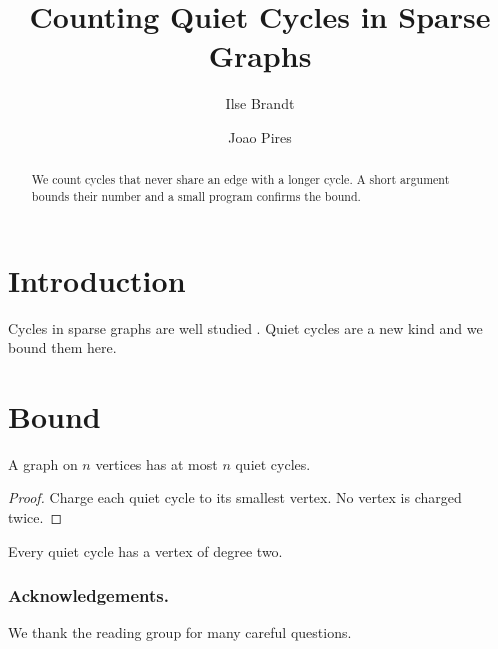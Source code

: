 \documentclass{llncs}
\begin{document}
\title{Counting Quiet Cycles in Sparse Graphs}
\author{Ilse Brandt \and Joao Pires}

\maketitle

\begin{abstract}
We count cycles that never share an edge with a longer cycle. A short
argument bounds their number and a small program confirms the bound.
\end{abstract}

\section{Introduction}
Cycles in sparse graphs are well studied \cite{brandt18}. Quiet cycles are
a new kind and we bound them here.

\section{Bound}
\begin{claim}
A graph on $n$ vertices has at most $n$ quiet cycles.
\end{claim}
\begin{proof}
Charge each quiet cycle to its smallest vertex. No vertex is charged twice.
\end{proof}

\begin{lemma}
Every quiet cycle has a vertex of degree two.
\end{lemma}

\subsubsection*{Acknowledgements.}
We thank the reading group for many careful questions.



\end{document}
